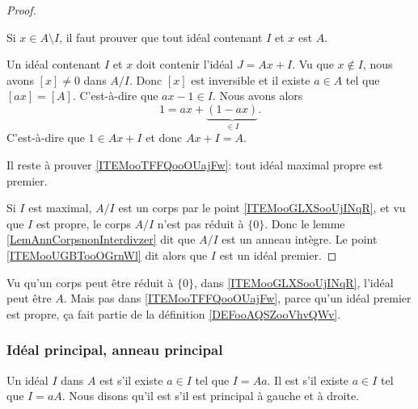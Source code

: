 \begin{proof}
\begin{subproof}
        \item[\ref{ITEMooGLXSooUjINqR} -- \( A/I\) est corps implique \( I\) maximum]

            Si \( x\in A\setminus I\), il faut prouver que tout idéal contenant \( I\) et \( x\) est \( A\).

            Un idéal contenant \( I\) et \( x\) doit contenir l'idéal \( J=Ax+I\). Vu que \( x\notin I\), nous avons \( [x]\neq 0\) dans \( A/I\). Donc \( [x] \) est inversible et il existe \( a\in A\) tel que \( [ax]=[A]\). C'est-à-dire que $ax-1\in I$. Nous avons alors
            \begin{equation}
                1=ax+\underbrace{(1-ax)}_{\in I}.
            \end{equation}
            C'est-à-dire que \( 1\in Ax+I\) et donc \( Ax+I=A\).
    \end{subproof}
    Il reste à prouver \ref{ITEMooTFFQooOUajFw}: tout idéal maximal propre est premier. 

    Si \( I\) est maximal, \( A/I\) est un corps par le point \ref{ITEMooGLXSooUjINqR}, et vu que \( I\) est propre, le corps \( A/I\) n'est pas réduit à \( \{ 0 \}\). Donc le lemme \ref{LemAnnCorpsnonInterdivzer} dit que \( A/I\) est un anneau intègre. Le point \ref{ITEMooUGBTooOGrnWl} dit alors que \( I\) est un idéal premier.
\end{proof}

\begin{remark}
    Vu qu'un corps peut être réduit à \( \{0\}\), dans \ref{ITEMooGLXSooUjINqR}, l'idéal peut être \( A\). Mais pas dans \ref{ITEMooTFFQooOUajFw}, parce qu'un idéal premier est propre, ça fait partie de la définition \ref{DEFooAQSZooVhvQWv}.
\end{remark}

\subsubsection{Idéal principal, anneau principal}
\begin{definition}      \label{DEFooMZRKooBPLAWH}
    Un idéal \( I\) dans \( A\) est  s'il existe \( a\in I\) tel que \( I= A a\). Il est  s'il existe \( a\in I\) tel que \( I=a A\). Nous disons qu'il est  s'il est principal à gauche et à droite.
\end{definition}

